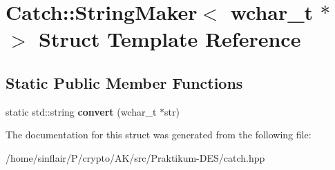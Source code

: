 \hypertarget{structCatch_1_1StringMaker_3_01wchar__t_01_5_01_4}{}\section{Catch\+:\+:String\+Maker$<$ wchar\+\_\+t $\ast$ $>$ Struct Template Reference}
\label{structCatch_1_1StringMaker_3_01wchar__t_01_5_01_4}
\subsection*{Static Public Member Functions}
\begin{DoxyCompactItemize}
\item 
\mbox{\label{structCatch_1_1StringMaker_3_01wchar__t_01_5_01_4_a6112fe324da2a0b3a690071a228ecd71}} 
static std\+::string {\bfseries convert} (wchar\+\_\+t $\ast$str)
\end{DoxyCompactItemize}


The documentation for this struct was generated from the following file\+:\begin{DoxyCompactItemize}
\item 
/home/sinflair/\+P/crypto/\+A\+K/src/\+Praktikum-\/\+D\+E\+S/catch.\+hpp\end{DoxyCompactItemize}
